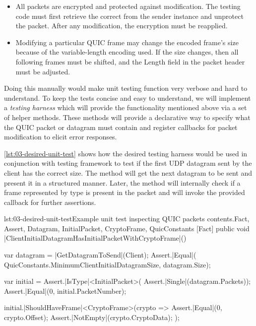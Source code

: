 \begin{itemize}

  \item All packets are encrypted and protected against modification. The testing code must first
retrieve the correct \CryptoSeal{} from the sender \QuicConnection{} instance and unprotect the
packet. After any modification, the encryption must be reapplied.

  \item Modifying a particular QUIC frame may change the encoded frame's size because of the
variable-length encoding used. If the size changes, then all following frames must be shifted, and
the Length field in the packet header must be adjusted.

\end{itemize}

Doing this manually would make unit testing function very verbose and hard to understand. To keep
the tests concise and easy to understand, we will implement a \textit{testing harness} which will
provide the functionality mentioned above via a set of helper methods. These methods will provide a
declarative way to specify what the QUIC packet or datagram must contain and register callbacks for
packet modification to elicit error responses.

\autoref{lst:03-desired-unit-test} shows how the desired testing harness would be used in
conjunction with \xUnit{} testing framework to test if the first UDP datagram sent by the client has
the correct size. The  method will get the next datagram to be sent and
present it in a structured manner. Later, the  method will
internally check if a frame represented by  type is present in the packet and will
invoke the provided callback for further assertions.

\begin{myListingCsharpNoPageBreak}{lst:03-desired-unit-test}{Example unit test inspecting QUIC packets contents.}{Fact, Assert, Datagram, InitialPacket, CryptoFrame, QuicConstants}{}
    [Fact]
    public void |ClientInitialDatagramHasInitialPacketWithCryptoFrame|()
    {
        var datagram = |GetDatagramToSend|(Client);
        Assert.|Equal|(
            QuicConstants.MinimumClientInitialDatagramSize,
            datagram.Size);

        var initial = Assert.|IsType|<InitialPacket>(
            Assert.|Single|(datagram.Packets));
        Assert.|Equal|(0, initial.PacketNumber);

        initial.|ShouldHaveFrame|<CryptoFrame>(crypto =>
        {
            Assert.|Equal|(0, crypto.Offset);
            Assert.|NotEmpty|(crypto.CryptoData);
        });
    }
\end{myListingCsharpNoPageBreak}

